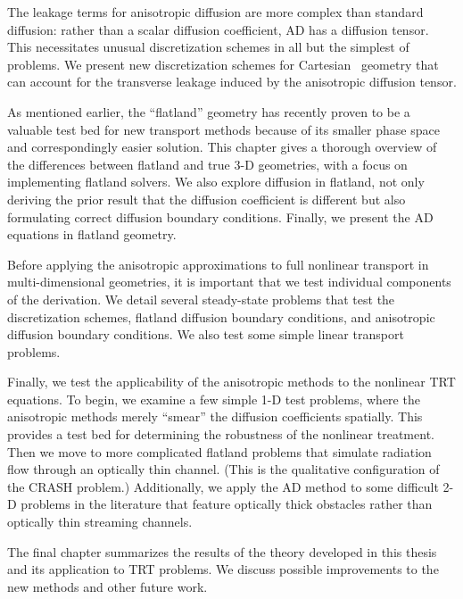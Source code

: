 The leakage terms for anisotropic diffusion are more complex than standard
diffusion: rather than a scalar diffusion coefficient, AD has a diffusion
tensor. This necessitates unusual discretization schemes in all but the simplest
of problems. We present new discretization schemes for Cartesian \xy\ geometry
that can account for the transverse leakage induced by the anisotropic diffusion
tensor.

As mentioned earlier, the ``flatland'' geometry has recently proven to be a
valuable test bed for new transport methods because of its smaller phase space
and correspondingly easier solution. This chapter gives a thorough overview of
the differences between flatland and true 3-D geometries, with a focus on
implementing flatland solvers. We also explore diffusion in flatland, not only
deriving the prior result that the diffusion coefficient is different but also
formulating correct diffusion boundary conditions. Finally, we present the AD
equations in flatland geometry.

Before applying the anisotropic approximations to full nonlinear transport in
multi-dimensional geometries, it is important that we test individual components
of the derivation. We detail several steady-state problems that test the
discretization schemes, flatland diffusion boundary conditions, and anisotropic
diffusion boundary conditions. We also test some simple linear transport
problems.

Finally, we test the applicability of the anisotropic methods to the nonlinear
TRT equations. To begin, we examine a few simple 1-D test problems, where the
anisotropic methods merely ``smear'' the diffusion coefficients spatially.
This provides a test bed for determining the robustness of the nonlinear
treatment. Then
we move to more complicated flatland problems that simulate radiation flow
through an optically thin channel. (This is the qualitative configuration of
the CRASH problem.)
Additionally, we apply the AD method to some difficult 2-D problems in the
literature that feature optically thick obstacles rather than optically thin
streaming channels.

The final chapter summarizes the results of the theory developed in this thesis
and its application to TRT problems. We discuss possible improvements to the new
methods and other future work.

